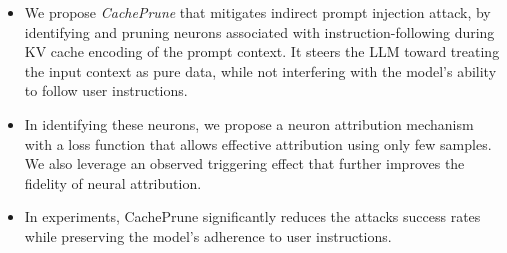 \begin{itemize}

    \item 
    We propose \textit{CachePrune} that mitigates indirect prompt injection attack, by identifying and pruning neurons associated with instruction-following during KV cache encoding of the prompt context. 
     It steers the LLM toward treating the input context as pure data, 
     while not interfering with the model's ability to follow user instructions.
    
    \item In identifying these neurons, we propose a neuron attribution mechanism with a loss function that allows effective attribution using only few samples.
    We also leverage an observed triggering effect that further improves the fidelity of neural attribution.
    
    \item In experiments, CachePrune significantly reduces the attacks success rates while preserving the model’s adherence to user instructions.
\end{itemize}
